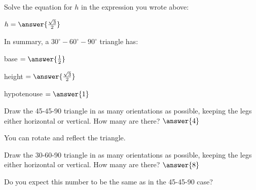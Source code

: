 \documentclass[number]{ximera}
\begin{document}
\begin{problem}
Solve the equation for $h$ in the expression you wrote above: 

$h = \answer{\frac{\sqrt{3}}{2}}$
\end{problem}

\begin{problem}
In summary, a $30^\circ-60^\circ-90^\circ$ triangle has:

base $=\answer{\frac{1}{2}}$

height $=\answer{\frac{\sqrt{3}}{2}}$

hypotenouse $=\answer{1}$
\end{problem}

\begin{exercise} Draw the 45-45-90 triangle in as many orientations as possible, keeping the legs either horizontal or vertical. How many are there? $\answer{4}$
\begin{hint}
You can rotate and reflect the triangle.
\end{hint}
\end{exercise}

\begin{exercise} Draw the 30-60-90 triangle in as many orientations as possible, keeping the legs either horizontal or vertical. How many are there? $\answer{8}$
\begin{hint}
Do you expect this number to be the same as in the 45-45-90 case?
\end{hint}
\end{exercise}
\end{document}
